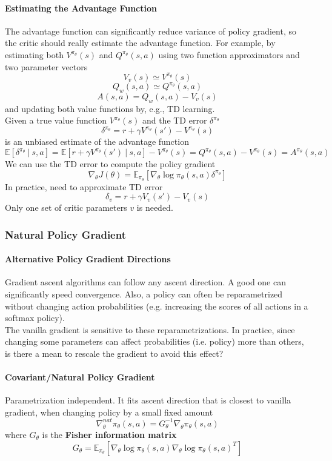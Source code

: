 \documentclass[10pt]{report}
\begin{document}
\paragraph{Estimating the Advantage Function} The advantage function can significantly reduce variance of policy gradient, so the critic should really estimate the advantage function. For example, by estimating both $V^{\pi_\theta}(s)$ and $Q^{\pi_\theta}(s,a)$ using two function approximators and two parameter vectors
$$V_v(s)\simeq V^{\pi_\theta}(s)$$
$$Q_w(s,a)\simeq Q^{\pi_\theta}(s,a)$$
$$A(s,a) = Q_w(s,a)-V_v(s)$$
and updating both value functions by, e.g., TD learning.\\
Given a true value function $V^{\pi_\theta}(s)$ and the TD error $\delta^{\pi_\theta}$ $$\delta^{\pi_\theta} = r+\gamma V^{\pi_\theta}(s')-V^{\pi_\theta}(s)$$
is an unbiased estimate of the advantage function
$$\mathbb{E}[\delta^{\pi_\theta}\:|\:s,a]=\mathbb{E}[r+\gamma V^{\pi_\theta}(s')\:|\:s,a]-V^{\pi_\theta}(s) = Q^{\pi_\theta}(s,a)-V^{\pi_\theta}(s) = A^{\pi_\theta}(s,a)$$
We can use the TD error to compute the policy gradient
$$\nabla_\theta J(\theta) = \mathbb{E}_{\pi_\theta}[\nabla_\theta\log\pi_\theta(s,a)\delta^{\pi_\theta}]$$
In practice, need to approximate TD error
$$\delta_v = r+\gamma V_v(s')-V_v(s)$$
Only one set of critic parameters $v$ is needed.
\subsubsection{Natural Policy Gradient}
\paragraph{Alternative Policy Gradient Directions} Gradient ascent algorithms can follow any ascent direction. A good one can significantly speed convergence. Also, a policy can often be reparametrized without changing action probabilities (e.g. increasing the scores of all actions in a softmax policy).\\
The vanilla gradient is sensitive to these reparametrizations. In practice, since changing some parameters can affect probabilities (i.e. policy) more than others, is there a mean to rescale the gradient to avoid this effect?
\paragraph{Covariant/Natural Policy Gradient} Parametrization independent. It fits ascent direction that is closest to vanilla gradient, when changing policy by a small fixed amount
$$\nabla_\theta^{nat}\pi_\theta(s,a) = G_\theta^{-1}\nabla_\theta\pi_\theta(s,a)$$
where $G_\theta$ is the \textbf{Fisher information matrix} $$G_\theta = \mathbb{E}_{\pi_\theta}[\nabla_\theta\log\pi_\theta(s,a)\nabla_\theta\log\pi_\theta (s,a)^T]$$
\end{document}
